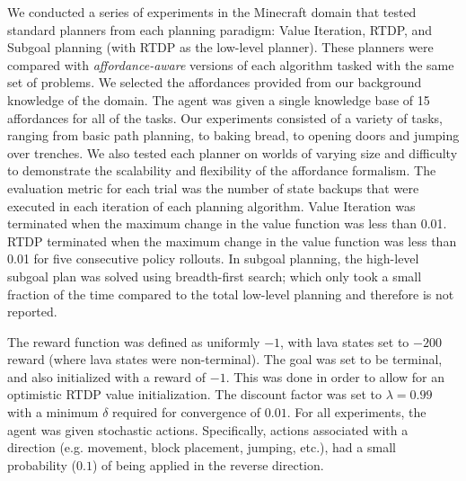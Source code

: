\documentclass[]{article}
\begin{document}
We conducted a series of experiments in the Minecraft domain that
tested standard planners from each planning paradigm: Value Iteration,
RTDP, and Subgoal planning (with RTDP as the low-level planner). These
planners were compared with {\it affordance-aware} versions of each
algorithm tasked with the same set of problems. We selected the
affordances provided from our background knowledge of the domain. The
agent was given a single knowledge base of 15 affordances for all of the tasks.
Our experiments consisted of a variety of tasks, ranging from basic path planning, to baking bread,
to opening doors and jumping over trenches.  We also tested each
planner on worlds of varying size and difficulty to demonstrate the
scalability and flexibility of the affordance formalism. The
evaluation metric for each trial was the number of state backups that
were executed in each iteration of each planning algorithm. Value
Iteration was terminated when the maximum change in the value function
was less than 0.01. RTDP terminated when the maximum change in the
value function was less than 0.01 for five consecutive policy
rollouts. In subgoal planning, the high-level subgoal plan was solved
using breadth-first search; which only took a small fraction of the
time compared to the total low-level planning and therefore is not
reported.

The reward function was defined as uniformly $-1$, with lava states 
set to $-200$ reward (where lava states were non-terminal). The goal was set to be terminal, and also
initialized with a reward of $-1$. This was done in order to allow for
an optimistic RTDP value initialization. The discount
factor was set to $\lambda = 0.99$ with a minimum $\delta$ required
for convergence of $0.01$. For all experiments, the agent was given stochastic actions. Specifically, actions associated with a direction (e.g. movement, block placement, jumping, etc.), had a small probability ($0.1$) of being applied in the reverse direction.
\end{document}

